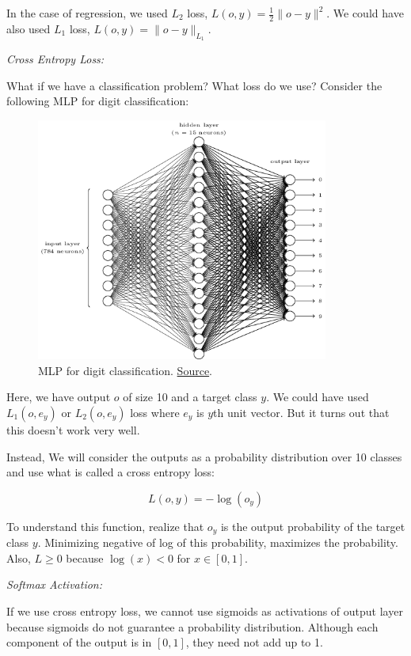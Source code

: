 \documentclass[a4paper]{tufte-handout}
\begin{document}
In the case of regression, we used \(L_2\) loss,
\(L(o, y) = \frac{1}{2} \| o - y\|^2\). We could have also used \(L_1\)
loss, \(L(o, y) = \| o - y \|_{L_1}\).

\hfill

\noindent \emph{Cross Entropy Loss:}

What if we have a classification problem? What loss do we use? Consider
the following MLP for digit classification:

\begin{figure}
  \includegraphics[height=80mm]{tikz12}
  \caption{ MLP for digit classification.
  \href{http://neuralnetworksanddeeplearning.com/chap1.html\%22}{Source}.
  }
\end{figure}

Here, we have output \(o\) of size 10 and a target class \(y\). We could
have used \(L_1(o, e_y)\) or \(L_2(o, e_y)\) loss where \(e_y\) is
\(y\)th unit vector. But it turns out that this doesn't work very well.

Instead, We will consider the outputs as a probability distribution over
10 classes and use what is called a cross entropy loss:

\[ L(o, y) = - \log(o_y) \]

To understand this function, realize that \(o_y\) is the output
probability of the target class \(y\). Minimizing negative of log of
this probability, maximizes the probability. Also, \(L \geq 0\) because
\(\log(x) < 0\) for \(x \in [0, 1]\).

\hfill

\noindent \emph{Softmax Activation:}

If we use cross entropy loss, we cannot use sigmoids as activations of
output layer because sigmoids do not guarantee a probability
distribution. Although each component of the output is in \([0, 1]\),
they need not add up to 1.
\end{document}
